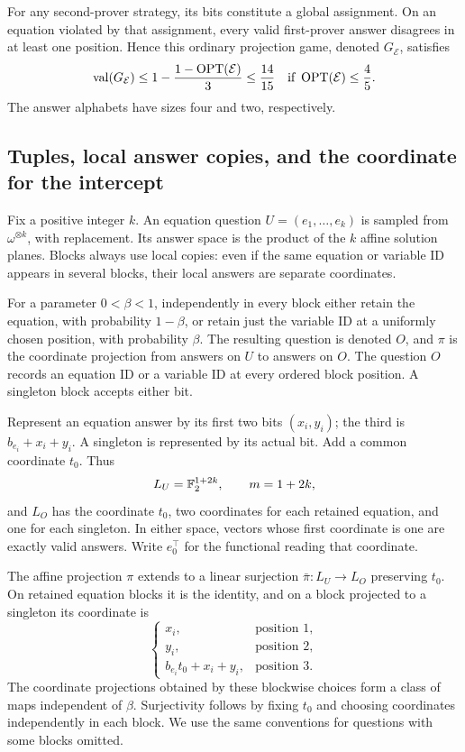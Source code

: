 For any second-prover strategy, its bits constitute a global assignment.
On an equation violated by that assignment, every valid first-prover
answer disagrees in at least one position.  Hence this ordinary
projection game, denoted \(G_{\mathcal E}\), satisfies
\begin{equation}
 \operatorname{val}(G_{\mathcal E})
 \le 1-\frac{1-\operatorname{OPT}(\mathcal E)}3
 \le \frac{14}{15}
 \quad\text{if }\operatorname{OPT}(\mathcal E)\le\frac45.
 \label{eq:base-game-gap}
\end{equation}
The answer alphabets have sizes four and two, respectively.

\subsection{Tuples, local answer copies, and the coordinate for the intercept}

Fix a positive integer \(k\).  An equation question
\(U=(e_1,\ldots,e_k)\) is sampled from \(\omega^{\otimes k}\), with
replacement.  Its answer space is the product of the \(k\) affine
solution planes.  Blocks always use local copies: even if the same
equation or variable ID appears in several blocks, their local answers
are separate coordinates.

For a parameter \(0<\beta<1\), independently in every block either
retain the equation, with probability \(1-\beta\), or retain just the
variable ID at a uniformly chosen position, with probability \(\beta\).
The resulting question is denoted \(O\), and \(\pi\) is the
coordinate projection from answers on \(U\) to answers on \(O\).
The question \(O\) records an equation ID or a variable ID at every
ordered block position.  A singleton block accepts either bit.

Represent an equation answer by its first two bits \((x_i,y_i)\);
the third is \(b_{e_i}+x_i+y_i\).  A singleton is represented by its
actual bit.  Add a common coordinate \(t_0\).  Thus
\[
 L_U=\mathbb F_2^{1+2k},\qquad m=1+2k,
\]
and \(L_O\) has the coordinate \(t_0\), two coordinates for each
retained equation, and one for each singleton.  In either space, vectors
whose first coordinate is one are exactly valid answers.  Write
\(e_0^\top\) for the functional reading that coordinate.

The affine projection \(\pi\) extends to a linear surjection
\(\bar\pi:L_U\to L_O\) preserving \(t_0\).  On retained equation
blocks it is the identity, and on a block projected to a singleton its
coordinate is
\begin{equation}
 \begin{cases}
 x_i,&\text{position }1,\\
 y_i,&\text{position }2,\\
 b_{e_i}t_0+x_i+y_i,&\text{position }3.
 \end{cases}
 \label{eq:outer-projection}
\end{equation}
The coordinate projections obtained by these blockwise choices form a
class of maps independent of \(\beta\).
Surjectivity follows by fixing \(t_0\) and choosing coordinates
independently in each block.  We use the same conventions for questions
with some blocks omitted.

